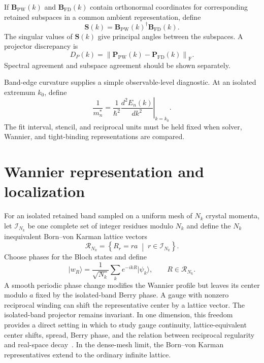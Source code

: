If $\mathbf B_{\mathrm{PW}}(k)$ and $\mathbf B_{\mathrm{FD}}(k)$ contain
orthonormal coordinates for corresponding retained subspaces in a common
ambient representation, define
\begin{equation}
    \mathbf S(k)
    =
    \mathbf B_{\mathrm{PW}}(k)^\dagger
    \mathbf B_{\mathrm{FD}}(k).
\end{equation}
The singular values of $\mathbf S(k)$ give principal angles between the
subspaces. A projector discrepancy is
\begin{equation}
    D_P(k)
    =
    \left\lVert
        \mathbf P_{\mathrm{PW}}(k)
        -
        \mathbf P_{\mathrm{FD}}(k)
    \right\rVert_{\mathrm F}.
\end{equation}
Spectral agreement and subspace agreement should be shown separately.

Band-edge curvature supplies a simple observable-level diagnostic. At an
isolated extremum $k_0$, define
\begin{equation}
    \frac{1}{m_n^{\ast}}
    =
    \frac{1}{\hbar^2}
    \left.
        \frac{d^2E_n(k)}{dk^2}
    \right|_{k=k_0}.
\end{equation}
The fit interval, stencil, and reciprocal units must be held fixed when solver,
Wannier, and tight-binding representations are compared.

\section*{Wannier representation and localization}

For an isolated retained band sampled on a uniform mesh of $N_k$ crystal
momenta, let $\mathcal I_{N_k}$ be one complete set of integer residues modulo
$N_k$ and define the $N_k$ inequivalent Born--von Karman lattice vectors
\begin{equation}
    \mathcal R_{N_k}
    =
    \left\{
        R_r=ra
        \;\middle|\;
        r\in\mathcal I_{N_k}
    \right\}.
\end{equation}
Choose phases for the Bloch states and define
\begin{equation}
    \lvert w_R\rangle
    =
    \frac{1}{\sqrt{N_k}}
    \sum_k
    e^{-ikR}
    \lvert\psi_k\rangle,
    \qquad
    R\in\mathcal R_{N_k}.
\end{equation}
A smooth periodic phase change modifies the Wannier profile but leaves its
center modulo $a$ fixed by the isolated-band Berry phase. A gauge with nonzero
reciprocal winding can shift the representative center by a lattice vector.
The isolated-band projector remains invariant. In one dimension, this freedom
provides a direct setting in which to study gauge continuity, lattice-equivalent
center shifts, spread, Berry phase, and the relation between reciprocal
regularity and real-space decay~\cite{kohn1959,marzari2012}. In the dense-mesh
limit, the Born--von Karman representatives extend to the ordinary infinite
lattice.

